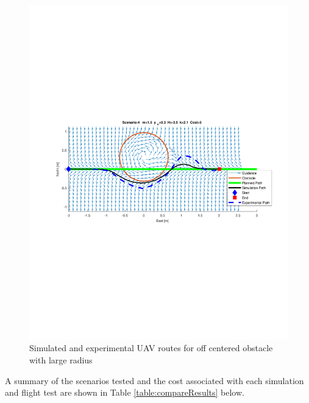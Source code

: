 \documentclass[numbered,pdftex]{ohio-etd}
\begin{document}
\begin{figure}[H]
	\centering
	\includegraphics[trim = 50 275 0 250, clip, width=16.5cm]{Figures/results/compareFigures/4Quiver}
	\caption{Simulated and experimental UAV routes for off centered obstacle with large radius}
	\label{fig:4Quiver}
\end{figure}

A summary of the scenarios tested and the cost associated with each simulation and flight test are shown in Table \ref{table:compareResults} below. 
\end{document}
